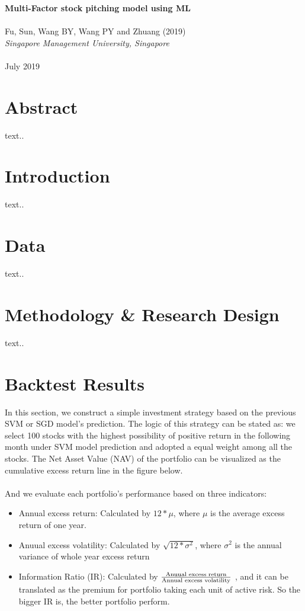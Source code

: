 \documentclass[12pt]{article}
\begin{document}
	\thispagestyle{plain}
	\noindent \Large \textbf{Multi-Factor stock pitching model using ML}\\ \\
	\noindent Fu, Sun, Wang BY, Wang PY and Zhuang (2019)\\
	\noindent \normalsize \textit{Singapore Management University, Singapore}\\ \\
	\noindent July 2019
	
\section{Abstract} %
	
	text..
	
\section{Introduction} %
     text..

		
\section{Data}
text..


\section{Methodology \& Research Design}
text..

\newpage
\section{Backtest Results}

In this section, we construct a simple investment strategy based on the previous SVM or SGD model's prediction. The logic of this strategy can be stated as: we select 100 stocks with the highest possibility of positive return in the following month under SVM model prediction and adopted a equal weight among all the stocks. The Net Asset Value (NAV) of the portfolio can be visualized as the cumulative excess return line in the figure below.\\ \\

\noindent And we evaluate each portfolio's performance based on three indicators:
	\begin{itemize}
		\item Annual excess return: Calculated by $12*\mu$, where $\mu$ is the average excess return of one year.
		\item Anuual excess volatility: Calculated by $\sqrt{12 * \sigma^2}$, where $\sigma^2$ is the annual variance of whole year excess return 
		\item Information Ratio (IR): Calculated by $\frac{\textnormal{Anuual excess return}}{\textnormal{Annual excess volatility}}$ , and it can be translated as the premium for portfolio taking each unit of active risk. So the bigger IR is, the better portfolio perform.
	\end{itemize}
\end{document}

